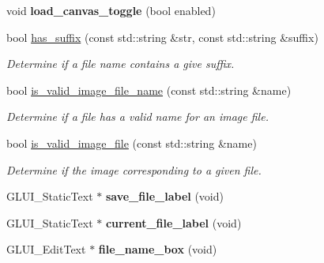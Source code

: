 \begin{DoxyCompactItemize}
\item 
void {\bfseries load\+\_\+canvas\+\_\+toggle} (bool enabled)\hypertarget{classimage__tools_1_1IOManager_acefb393df8796d8d2f68a0aa7a67a1eb}{}\label{classimage__tools_1_1IOManager_acefb393df8796d8d2f68a0aa7a67a1eb}

\item 
bool \hyperlink{classimage__tools_1_1IOManager_ab8176a3f8684b1da88565a84c752494e}{has\+\_\+suffix} (const std\+::string \&str, const std\+::string \&suffix)
\begin{DoxyCompactList}\small\item\em Determine if a file name contains a give suffix. \end{DoxyCompactList}\item 
bool \hyperlink{classimage__tools_1_1IOManager_ac65d32aa03ea74c4c81d135a4e56f6fd}{is\+\_\+valid\+\_\+image\+\_\+file\+\_\+name} (const std\+::string \&name)
\begin{DoxyCompactList}\small\item\em Determine if a file has a valid name for an image file. \end{DoxyCompactList}\item 
bool \hyperlink{classimage__tools_1_1IOManager_af5559c30af4a3b2d1a86c6081d840170}{is\+\_\+valid\+\_\+image\+\_\+file} (const std\+::string \&name)
\begin{DoxyCompactList}\small\item\em Determine if the image corresponding to a given file. \end{DoxyCompactList}\item 
G\+L\+U\+I\+\_\+\+Static\+Text $\ast$ {\bfseries save\+\_\+file\+\_\+label} (void)\hypertarget{classimage__tools_1_1IOManager_a44ee0e7d400f05f1ebf992eb5faa6902}{}\label{classimage__tools_1_1IOManager_a44ee0e7d400f05f1ebf992eb5faa6902}

\item 
G\+L\+U\+I\+\_\+\+Static\+Text $\ast$ {\bfseries current\+\_\+file\+\_\+label} (void)\hypertarget{classimage__tools_1_1IOManager_a21fb95777da9b6b0059fe89bbac79666}{}\label{classimage__tools_1_1IOManager_a21fb95777da9b6b0059fe89bbac79666}

\item 
G\+L\+U\+I\+\_\+\+Edit\+Text $\ast$ {\bfseries file\+\_\+name\+\_\+box} (void)\hypertarget{classimage__tools_1_1IOManager_a1ffebca9d8453a19a051119f3d216784}{}\label{classimage__tools_1_1IOManager_a1ffebca9d8453a19a051119f3d216784}

\end{DoxyCompactItemize}
